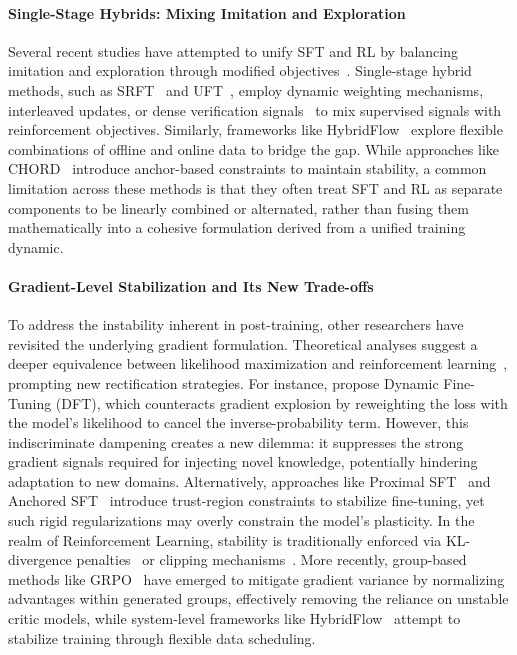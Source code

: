\paragraph{Single-Stage Hybrids: Mixing Imitation and Exploration}
Several recent studies have attempted to unify SFT and RL by balancing imitation and exploration through modified objectives~\citep{yuan2024self}. Single-stage hybrid methods, such as SRFT~\citep{fu2025srft} and UFT~\citep{liu2025uft}, employ dynamic weighting mechanisms, interleaved updates, or dense verification signals~\citep{wang2024math, yu2024ovm} to mix supervised signals with reinforcement objectives. Similarly, frameworks like HybridFlow~\citep{sheng2025hybridflow} explore flexible combinations of offline and online data to bridge the gap. While approaches like CHORD~\citep{zhu2025anchored} introduce anchor-based constraints to maintain stability, a common limitation across these methods is that they often treat SFT and RL as separate components to be linearly combined or alternated, rather than fusing them mathematically into a cohesive formulation derived from a unified training dynamic.

\paragraph{Gradient-Level Stabilization and Its New Trade-offs}
To address the instability inherent in post-training, other researchers have revisited the underlying gradient formulation. Theoretical analyses suggest a deeper equivalence between likelihood maximization and reinforcement learning~\citep{swamy2025all}, prompting new rectification strategies. For instance, \citet{wu2025generalization} propose Dynamic Fine-Tuning (DFT), which counteracts gradient explosion by reweighting the loss with the model's likelihood to cancel the inverse-probability term. However, this indiscriminate dampening creates a new dilemma: it suppresses the strong gradient signals required for injecting novel knowledge, potentially hindering adaptation to new domains. Alternatively, approaches like Proximal SFT~\citep{zhu2025proximal} and Anchored SFT~\citep{zhu2025anchored} introduce trust-region constraints to stabilize fine-tuning, yet such rigid regularizations may overly constrain the model's plasticity. In the realm of Reinforcement Learning, stability is traditionally enforced via KL-divergence penalties~\citep{ouyang2022training} or clipping mechanisms~\citep{schulman2017proximal}. More recently, group-based methods like GRPO~\citep{shao2024deepseekmath} have emerged to mitigate gradient variance by normalizing advantages within generated groups, effectively removing the reliance on unstable critic models, while system-level frameworks like HybridFlow~\citep{sheng2025hybridflow} attempt to stabilize training through flexible data scheduling.
